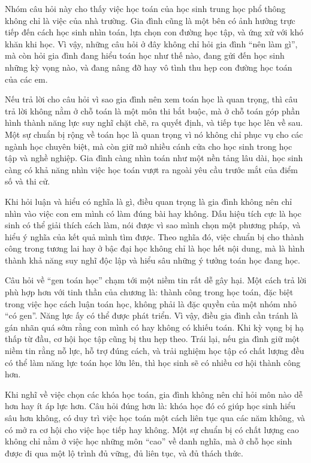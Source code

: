\documentclass[
  10pt,
  a4paper,
  landscape,
  twoside,
  openany
]{scrbook}
\newcommand{\NOTE}[1]{#1}
\begin{document}
{
\NOTE{Nhóm câu hỏi này cho thấy việc học toán của học sinh trung học phổ thông không chỉ là việc của nhà trường. Gia đình cũng là một bên có ảnh hưởng trực tiếp đến cách học sinh nhìn toán, lựa chọn con đường học tập, và ứng xử với khó khăn khi học. Vì vậy, những câu hỏi ở đây không chỉ hỏi gia đình “nên làm gì”, mà còn hỏi gia đình đang hiểu toán học như thế nào, đang gửi đến học sinh những kỳ vọng nào, và đang nâng đỡ hay vô tình thu hẹp con đường học toán của các em.

Nếu trả lời cho câu hỏi vì sao gia đình nên xem toán học là quan trọng, thì câu trả lời không nằm ở chỗ toán là một môn thi bắt buộc, mà ở chỗ toán góp phần hình thành năng lực suy nghĩ chặt chẽ, ra quyết định, và tiếp tục học lên về sau. Một sự chuẩn bị rộng về toán học là quan trọng vì nó không chỉ phục vụ cho các ngành học chuyên biệt, mà còn giữ mở nhiều cánh cửa cho học sinh trong học tập và nghề nghiệp. Gia đình càng nhìn toán như một nền tảng lâu dài, học sinh càng có khả năng nhìn việc học toán vượt ra ngoài yêu cầu trước mắt của điểm số và thi cử.

Khi hỏi luận và hiểu có nghĩa là gì, điều quan trọng là gia đình không nên chỉ nhìn vào việc con em mình có làm đúng bài hay không. Dấu hiệu tích cực là học sinh có thể giải thích cách làm, nói được vì sao mình chọn một phương pháp, và hiểu ý nghĩa của kết quả mình tìm được. Theo nghĩa đó, việc chuẩn bị cho thành công trong tương lai hay ở bậc đại học không chỉ là học hết nội dung, mà là hình thành khả năng suy nghĩ độc lập và hiểu sâu những ý tưởng toán học đang học.

Câu hỏi về ``gen toán học'' chạm tới một niềm tin rất dễ gây hại. Một cách trả lời phù hợp hơn với tinh thần của chương là: thành công trong học toán, đặc biệt trong việc học cách luận toán học, không phải là đặc quyền của một nhóm nhỏ ``có gen''. Năng lực ấy có thể được phát triển. Vì vậy, điều gia đình cần tránh là gán nhãn quá sớm rằng con mình có hay không có khiếu toán. Khi kỳ vọng bị hạ thấp từ đầu, cơ hội học tập cũng bị thu hẹp theo. Trái lại, nếu gia đình giữ một niềm tin rằng nỗ lực, hỗ trợ đúng cách, và trải nghiệm học tập có chất lượng đều có thể làm năng lực toán học lớn lên, thì học sinh sẽ có nhiều cơ hội thành công hơn.

Khi nghĩ về việc chọn các khóa học toán, gia đình không nên chỉ hỏi môn nào dễ hơn hay ít áp lực hơn. Câu hỏi đúng hơn là: khóa học đó có giúp học sinh hiểu sâu hơn không, có duy trì việc học toán một cách liên tục qua các năm không, và có mở ra cơ hội cho việc học tiếp hay không. Một sự chuẩn bị có chất lượng cao không chỉ nằm ở việc học những môn ``cao'' về danh nghĩa, mà ở chỗ học sinh được đi qua một lộ trình đủ vững, đủ liên tục, và đủ thách thức.

}}
\end{document}
